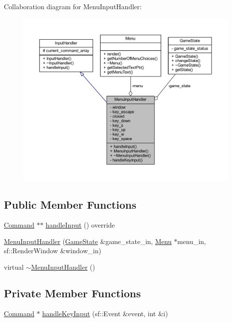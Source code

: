 Collaboration diagram for Menu\+Input\+Handler\+:
\nopagebreak
\begin{figure}[H]
\begin{center}
\leavevmode
\includegraphics[width=350pt]{class_menu_input_handler__coll__graph}
\end{center}
\end{figure}
\subsection*{Public Member Functions}
\begin{DoxyCompactItemize}
\item 
\hyperlink{class_command}{Command} $\ast$$\ast$ \hyperlink{class_menu_input_handler_a60840342f557c79f31097aa713ba7a37}{handle\+Input} () override
\item 
\hyperlink{class_menu_input_handler_a244c829acc6ffe44795e44cb2980615b}{Menu\+Input\+Handler} (\hyperlink{class_game_state}{Game\+State} \&game\+\_\+state\+\_\+in, \hyperlink{class_menu}{Menu} $\ast$menu\+\_\+in, sf\+::\+Render\+Window \&window\+\_\+in)
\item 
virtual \hyperlink{class_menu_input_handler_aad61207bccc58ff8c688ffb265ca13db}{$\sim$\+Menu\+Input\+Handler} ()
\end{DoxyCompactItemize}
\subsection*{Private Member Functions}
\begin{DoxyCompactItemize}
\item 
\hyperlink{class_command}{Command} $\ast$ \hyperlink{class_menu_input_handler_aefd1edfd9f0d0770383c4977416de3bf}{handle\+Key\+Input} (sf\+::\+Event \&event, int \&i)
\end{DoxyCompactItemize}
